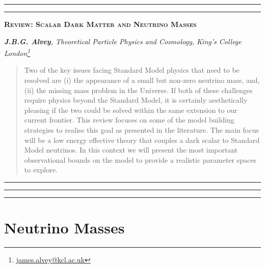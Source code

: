\documentclass[10pt]{article}
\renewcommand*{\thefootnote}{\fnsymbol{footnote}}
\begin{document}
\hrule
\vspace{1pt}
\hrule
\begin{center}
\large\textsc{\color{darkblue}\textbf{Review: Scalar Dark Matter and Neutrino Masses}}
\vspace{5pt}

\footnotesize\textit{\textbf{J.B.G. Alvey}, Theoretical Particle Physics and Cosmology, King's College London\footnote{\href{mailto:james.alvey@kcl.ac.uk}{james.alvey@kcl.ac.uk}}}
\end{center}
\begin{abstract}
\noindent Two of the key issues facing Standard Model physics that need to be resolved are (i) the appearance of a small but non-zero neutrino mass, and, (ii) the missing mass problem in the Universe. If both of these challenges require physics beyond the Standard Model, it is certainly aesthetically pleasing if the two could be solved within the same extension to our current frontier. This review focuses on some of the model building strategies to realise this goal as presented in the literature. The main focus will be a low energy effective theory that couples a dark scalar to Standard Model neutrinos. In this context we will present the most important observational bounds on the model to provide a realistic parameter spaces to explore.
\end{abstract}
\hrule
\tableofcontents
\vspace{5pt}
\hrule
\vspace{1pt}
\hrule
\vspace{10pt}
\renewcommand{\thefootnote}{\tiny\textbf{\arabic{section}.\arabic{footnote}}}
\section{Neutrino Masses}
\end{document}
